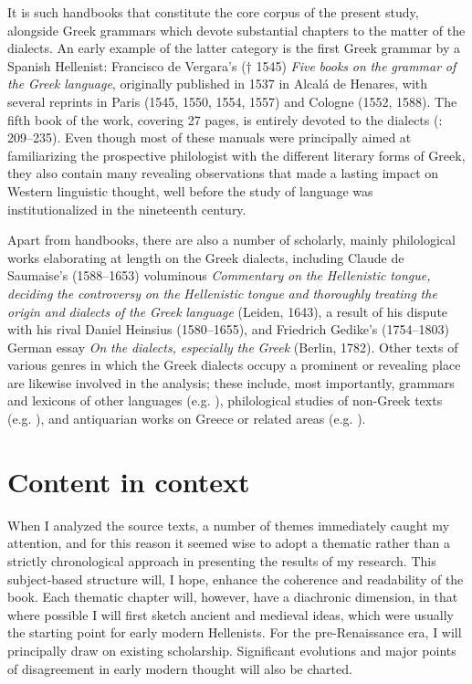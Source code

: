 It is such handbooks that constitute the core corpus of the present study, alongside Greek grammars which devote substantial chapters to the matter of the dialects. An early example of the latter category is the first Greek grammar by a Spanish Hellenist: Francisco de Vergara’s († 1545) \textit{Five} \textit{books} \textit{on} \textit{the} \textit{grammar} \textit{of} \textit{the} \textit{Greek} \textit{language}, originally published in 1537 in Alcalá de Henares, with several reprints in Paris (1545, 1550, 1554, 1557) and Cologne (1552, 1588). The fifth book of the work, covering 27 pages, is entirely devoted to the dialects (\citealt{Vergara1537}: 209–235). Even though most of these manuals were principally aimed at familiarizing the prospective philologist with the different literary forms of Greek, they also contain many revealing observations that made a lasting impact on Western linguistic thought, well before the study of language was institutionalized in the nineteenth century.

Apart from handbooks, there are also a number of scholarly, mainly philological works elaborating at length on the Greek dialects, including Claude de Saumaise’s (1588–1653) voluminous \textit{Commentary} \textit{on} \textit{the} \textit{Hellenistic} \textit{tongue,} \textit{deciding} \textit{the} \textit{controversy} \textit{on} \textit{the} \textit{Hellenistic} \textit{tongue} \textit{and} \textit{thoroughly} \textit{treating} \textit{the} \textit{origin} \textit{and} \textit{dialects} \textit{of} \textit{the} \textit{Greek} \textit{language} (Leiden, 1643), a result of his dispute with his rival Daniel Heinsius (1580–1655), and Friedrich Gedike’s (1754–1803) German essay \textit{On} \textit{the} \textit{dialects,} \textit{especially} \textit{the} \textit{Greek} (Berlin, 1782). Other texts of various genres in which the Greek dialects occupy a prominent or revealing place are likewise involved in the analysis; these include, most importantly, grammars and lexicons of other languages (e.g. \citealt{Gill1619}), philological studies of non-Greek texts (e.g. \citealt{Schultens1748}), and antiquarian works on Greece or related areas (e.g. \citealt{Castelli1769}).

\section{Content in context}

When I analyzed the source texts, a number of themes immediately caught my attention, and for this reason it seemed wise to adopt a thematic rather than a strictly chronological approach in presenting the results of my research. This subject-based structure will, I hope, enhance the coherence and readability of the book. Each thematic chapter will, however, have a diachronic dimension, in that where possible I will first sketch ancient and medieval ideas, which were usually the starting point for early modern Hellenists. For the pre-Renaissance era, I will principally draw on existing scholarship. Significant evolutions and major points of disagreement in early modern thought will also be charted.

